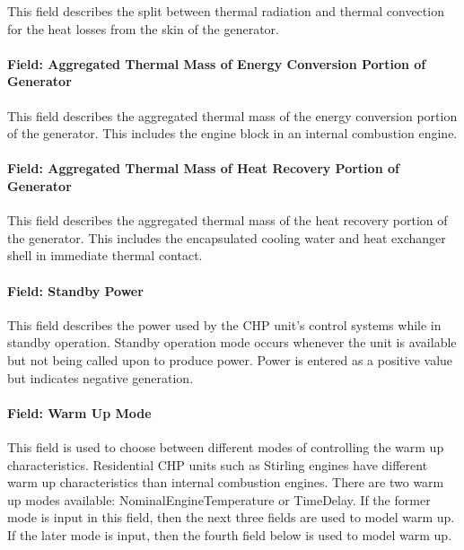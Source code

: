 This field describes the split between thermal radiation and thermal convection for the heat losses from the skin of the generator.

\paragraph{Field: Aggregated Thermal Mass of Energy Conversion Portion of Generator}\label{field-aggregated-thermal-mass-of-energy-conversion-portion-of-generator}

This field describes the aggregated thermal mass of the energy conversion portion of the generator. This includes the engine block in an internal combustion engine.

\paragraph{Field: Aggregated Thermal Mass of Heat Recovery Portion of Generator}\label{field-aggregated-thermal-mass-of-heat-recovery-portion-of-generator}

This field describes the aggregated thermal mass of the heat recovery portion of the generator. This includes the encapsulated cooling water and heat exchanger shell in immediate thermal contact.

\paragraph{Field: Standby Power}\label{field-standby-power-1}

This field describes the power used by the CHP unit's control systems while in standby operation. Standby operation mode occurs whenever the unit is available but not being called upon to produce power. Power is entered as a positive value but indicates negative generation.

\paragraph{Field: Warm Up Mode}\label{field-warm-up-mode}

This field is used to choose between different modes of controlling the warm up characteristics. Residential CHP units such as Stirling engines have different warm up characteristics than internal combustion engines. There are two warm up modes available: NominalEngineTemperature or TimeDelay. If the former mode is input in this field, then the next three fields are used to model warm up. If the later mode is input, then the fourth field below is used to model warm up.

